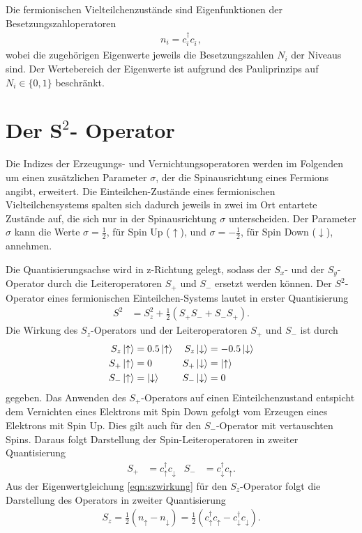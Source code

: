 Die fermionischen Vielteilchenzustände sind Eigenfunktionen der Besetzungszahloperatoren
\begin{align}
  n_i = c_i^\dag c_i^{\phantom{\dag}},
  \label{eqn:besetzer}
\end{align}
wobei die zugehörigen Eigenwerte jeweils die Besetzungszahlen $N_i$ der Niveaus sind.
Der Wertebereich der Eigenwerte ist aufgrund des Pauliprinzips auf $N_i \in \{ 0,1 \}$ beschränkt.

\section{Der \texorpdfstring{$\symbf{S}^2$}{TEXT}- Operator}

Die Indizes der Erzeugungs- und Vernichtungsoperatoren werden im Folgenden um einen zusätzlichen Parameter $\sigma$, der die Spinausrichtung eines Fermions angibt, erweitert.
Die Einteilchen-Zustände eines fermionischen Vielteilchensystems spalten sich dadurch jeweils in zwei im Ort entartete Zustände auf, die sich nur in der Spinausrichtung $\sigma$ unterscheiden.
Der Parameter $\sigma$ kann die Werte $\sigma = \frac12$, für Spin Up ($\uparrow$), und $\sigma = -\frac12$, für Spin Down ($\downarrow$), annehmen.
\cite{schwabl}

Die Quantisierungsachse wird in z-Richtung gelegt, sodass der $S_x$- und der $S_y$-Operator durch die
Leiteroperatoren $S_+$ und $S_-$ ersetzt werden können. Der $S^2$-Operator eines fermionischen Einteilchen-Systems lautet in erster Quantisierung
\begin{align}
  S^2 & = S_z^2 + \frac12 \left( S_+ S_- + S_- S_+ \right).
  \label{eqn:squadoperatorein}
\end{align}
Die Wirkung des $S_z$-Operators und der Leiteroperatoren $S_+$ und $S_-$ ist durch
\begin{align}
  S_z \ket{\uparrow} & = 0.5\ket{\uparrow} & S_z \ket{\downarrow} & = -0.5\ket{\downarrow} \label{eqn:szwirkung}\\
  S_+ \ket{\uparrow} & = 0 & S_+ \ket{\downarrow} & = \ket{\uparrow} \label{eqn:spluswirkung}\\
  S_- \ket{\uparrow} & = \ket{\downarrow} & S_- \ket{\downarrow} & = 0 \label{eqn:sminuswirkung}
\end{align}
gegeben. Das Anwenden des $S_+$-Operators auf einen Einteilchenzustand entspicht dem Vernichten eines Elektrons mit Spin Down gefolgt vom Erzeugen
eines Elektrons mit Spin Up. Dies gilt auch für den $S_-$-Operator mit vertauschten Spins. Daraus folgt Darstellung der Spin-Leiteroperatoren in zweiter Quantisierung
\begin{align}
  S_+ & = c_\uparrow^\dag c_\downarrow^{\phantom{\dag}} & S_- & = c_\downarrow^\dag c_\uparrow^{\phantom{\dag}}. \label{eqn:leitersecondquant}
\end{align}
Aus der Eigenwertgleichung \eqref{eqn:szwirkung} für den $S_z$-Operator folgt die Darstellung des Operators in zweiter Quantisierung
\begin{align}
  S_z = \frac12 (n_\uparrow -  n_\downarrow) = \frac12 (c_\uparrow^\dag c_\uparrow^{\phantom{\dag}} - c_\downarrow^\dag c_\downarrow^{\phantom{\dag}}) \label{eqn:szsecondquant}.
\end{align}
\cite{schwabl}

